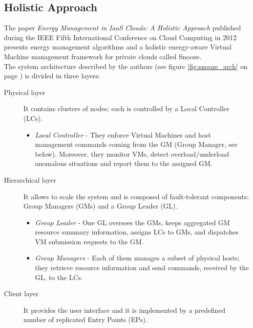 \subsection{Holistic Approach}
\label{sec:sota_holistic}
The paper \textit{Energy Management in IaaS Clouds: A Holistic Approach} published during the IEEE Fifth International Conference on Cloud Computing in 2012 presents energy management algorithms and a holistic energy-aware Virtual Machine management framework for private clouds called Snooze.\\
The system architecture described by the authors (see figure \ref{fig:snooze_arch} on page \pageref{fig:snooze_arch}) is divided in three layers:
\begin{description}
  \item[Physical layer] It contains clusters of nodes; each is controlled by a Local Controller (LCs).
    \begin{itemize}
      \item \textit{Local Controller} - They enforce Virtual Machines and host management commands coming from the GM (Group Manager, see below). Moreover, they monitor VMs, detect overload/underload anomalous situations and report them to the assigned GM.
    \end{itemize}
  \item[Hierarchical layer] It allows to scale the system and is composed of fault-tolerant components: Group Managers (GMs) and a Group Leader (GL).
      \begin{itemize}
      \item \textit{Group Leader} - One GL oversees the GMs, keeps aggregated GM resource summary information, assigns LCs to GMs, and dispatches VM submission requests to the GM.
      \item \textit{Group Managers} - Each of them manages a subset of physical hosts; they retrieve resource information and send commands, received by the GL, to the LCs.
      \end{itemize}
  \item[Client layer] It provides the user interface and it is implemented by a predefined number of replicated Entry Points (EPs).
\end{description}

